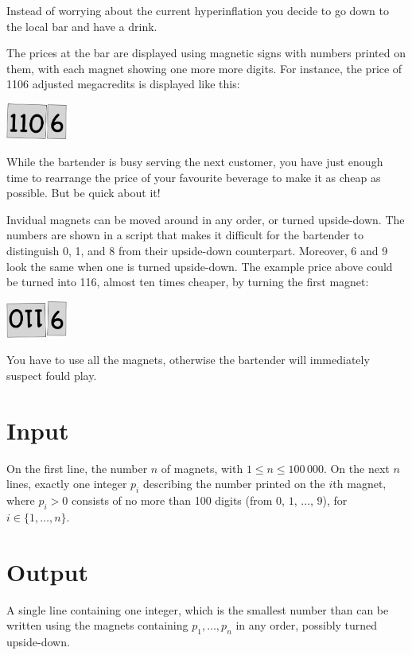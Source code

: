 

Instead of worrying about the current hyperinflation you decide to go down to the local bar and have a drink.

The prices at the bar are displayed using magnetic signs with numbers printed on them, with each magnet showing one more more digits.
For instance, the price of 1106 adjusted megacredits is displayed like this:

\medskip
\includegraphics[width = 2cm]{img/from.png}

While the bartender is busy serving the next customer, you have just enough time to rearrange the price of your favourite beverage to make it as cheap as possible.
But be quick about it!

Invidual magnets can be moved around in any order, or turned upside-down.
The numbers are shown in a script that makes it difficult for the bartender to distinguish 0, 1, and 8 from their upside-down counterpart.
Moreover, 6 and 9 look the same when one is turned upside-down.
The example price above could be turned into 116, almost ten times cheaper, by turning the first magnet:

\medskip
\includegraphics[width = 2cm]{img/to.png}

You have to use all the magnets, otherwise the bartender will immediately suspect fould play.

\section*{Input}

On the first line, the number $n$ of magnets, with $1\leq n\leq 100\,000$.
On the next $n$ lines, exactly one integer $p_i$ describing the number printed on the $i$th magnet, where $p_i>0$ consists of no more than 100 digits (from $0$, $1$, $\ldots$, $9$), for $i\in\{1,\ldots, n\}$.

\section*{Output}

A single line containing one integer, which is the smallest number than can be written using the magnets containing $p_1,\ldots,p_n$ in any order, possibly turned upside-down.
